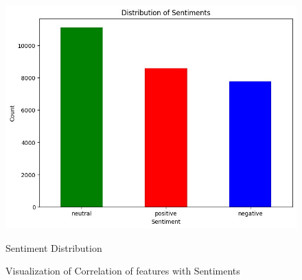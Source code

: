 \documentclass[a4paper]{article}
\theoremstyle{plain}
\theoremstyle{definition}
\begin{document}
\begin{figure}[htbp]
\begin{minipage}[b]{0.3\textwidth}
        \centering
        \includegraphics[width=\textwidth]{figs/5.jpg}
        \caption*{Sentiment Distribution}
        \label{fig:figure5}
    \end{minipage}
    
    \caption{Visualization of Correlation of features with Sentiments}
    \label{fig:dataset_figures}
\end{figure}
\end{document}
